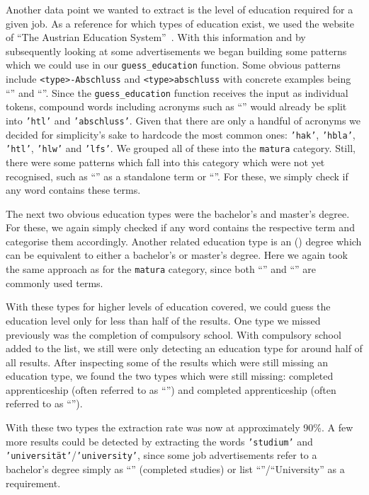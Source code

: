 \documentclass[runningheads]{llncs}
\begin{document}
Another data point we wanted to extract is the level of education required for a given job. As a reference for which types of education exist, we used the website of “The Austrian Education System”~\cite{austrian_education_system}. With this information and by subsequently looking at some advertisements we began building some patterns which we could use in our \texttt{guess\_education} function. Some obvious patterns include \texttt{<type>-Abschluss} and \texttt{<type>abschluss} with concrete examples being “” and “”. Since the \texttt{guess\_education} function receives the input as individual tokens, compound words including acronyms such as “” would already be split into \texttt{'htl'} and \texttt{'abschluss'}. Given that there are only a handful of acronyms we decided for simplicity's sake to hardcode the most common ones: \texttt{'hak'}, \texttt{'hbla'}, \texttt{'htl'}, \texttt{'hlw'} and \texttt{'lfs'}. We grouped all of these into the \texttt{matura} category. Still, there were some patterns which fall into this category which were not yet recognised, such as “” as a standalone term or “”. For these, we simply check if any word contains these terms.

The next two obvious education types were the bachelor's and master's degree. For these, we again simply checked if any word contains the respective term and categorise them accordingly. Another related education type is an  () degree which can be equivalent to either a bachelor's or master's degree. Here we again took the same approach as for the \texttt{matura} category, since both “” and “” are commonly used terms.

With these types for higher levels of education covered, we could guess the education level only for less than half of the results. One type we missed previously was the completion of compulsory school. With compulsory school added to the list, we still were only detecting an education type for around half of all results. After inspecting some of the results which were still missing an education type, we found the two types which were still missing: completed apprenticeship (often referred to as “”) and completed apprenticeship (often referred to as “”).

With these two types the extraction rate was now at approximately 90\%. A few more results could be detected by extracting the words \texttt{'studium'} and \texttt{'universität'}/\texttt{'university'}, since some job advertisements refer to a bachelor's degree simply as “” (completed studies) or list “”/“University” as a requirement.
\end{document}
